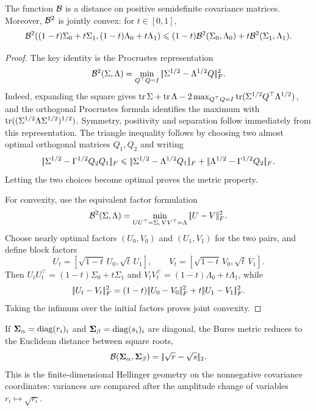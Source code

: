 \begin{prop}\label{prop-bures-metric-convex}
	The function $\mathcal{B}$ is a distance on positive semidefinite covariance matrices. Moreover, $\mathcal{B}^2$ is jointly convex: for $t\in[0,1]$,
	\[
		\mathcal{B}^2((1-t)\Sigma_0+t\Sigma_1,(1-t)\Lambda_0+t\Lambda_1)
		\leqslant
		(1-t)\mathcal{B}^2(\Sigma_0,\Lambda_0)+t\mathcal{B}^2(\Sigma_1,\Lambda_1).
	\]
\end{prop}
\begin{proof}
	The key identity is the Procrustes representation
	\[
		\mathcal{B}^2(\Sigma,\Lambda)
		=
		\min_{Q^\top Q=I}|\!| \Sigma^{1/2}-\Lambda^{1/2}Q |\!|_F^2.
	\]
	Indeed, expanding the square gives $\operatorname{tr}\Sigma+\operatorname{tr}\Lambda-2\max_{Q^\top Q=I}\operatorname{tr}(\Sigma^{1/2}Q^\top\Lambda^{1/2})$, and the orthogonal Procrustes formula identifies the maximum with $\operatorname{tr}((\Sigma^{1/2}\Lambda\Sigma^{1/2})^{1/2})$. Symmetry, positivity and separation follow immediately from this representation. The triangle inequality follows by choosing two almost optimal orthogonal matrices $Q_1,Q_2$ and writing
	\[
		|\!| \Sigma^{1/2}-\Gamma^{1/2}Q_2Q_1 |\!|_F
		\leqslant
		|\!| \Sigma^{1/2}-\Lambda^{1/2}Q_1 |\!|_F
		+
		|\!| \Lambda^{1/2}-\Gamma^{1/2}Q_2 |\!|_F.
	\]
	Letting the two choices become optimal proves the metric property.

	For convexity, use the equivalent factor formulation
	\[
		\mathcal{B}^2(\Sigma,\Lambda)
		=
		\min_{UU^\top=\Sigma,\thinspace VV^\top=\Lambda}|\!| U-V |\!|_F^2.
	\]
	Choose nearly optimal factors $(U_0,V_0)$ and $(U_1,V_1)$ for the two pairs, and define block factors
	\[
		U_t=[\sqrt{1-t}\,U_0,\sqrt t\,U_1],
		\qquad
		V_t=[\sqrt{1-t}\,V_0,\sqrt t\,V_1].
	\]
	Then $U_tU_t^\top=(1-t)\Sigma_0+t\Sigma_1$ and $V_tV_t^\top=(1-t)\Lambda_0+t\Lambda_1$, while
	\[
		|\!| U_t-V_t |\!|_F^2
		=
		(1-t)|\!| U_0-V_0 |\!|_F^2+t|\!| U_1-V_1 |\!|_F^2.
	\]
	Taking the infimum over the initial factors proves joint convexity.
\end{proof}

\begin{rem}
	If $\mathbf{\Sigma}_\alpha=\operatorname{diag}(r_i)_i$ and $\mathbf{\Sigma}_\beta=\operatorname{diag}(s_i)_i$ are diagonal, the Bures metric reduces to the Euclidean distance between square roots,
	\[
		\mathcal{B}(\mathbf{\Sigma}_\alpha,\mathbf{\Sigma}_\beta)=|\!| \sqrt r-\sqrt s |\!|_2.
	\]
	This is the finite-dimensional Hellinger geometry on the nonnegative covariance coordinates: variances are compared after the amplitude change of variables $r_i\mapsto\sqrt{r_i}$.
\end{rem}
